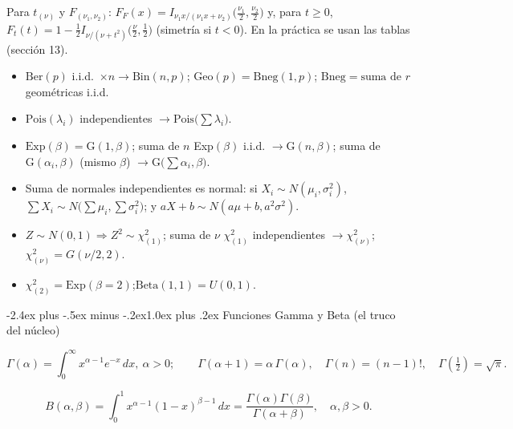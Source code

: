 \documentclass[10pt,a4paper]{article}
\makeatletter
\renewcommand\section{\@startsection{section}{1}{0pt}%
  {-2.4ex plus -.5ex minus -.2ex}{1.0ex plus .2ex}%
  {\normalfont\large\bfseries\color{seccolor}}}
\makeatother
\begin{document}
\smallskip
\noindent\footnotesize Para $t_{(\nu)}$ y $F_{(\nu_1,\nu_2)}$:
$F_F(x)=I_{\nu_1x/(\nu_1x+\nu_2)}\big(\tfrac{\nu_1}{2},\tfrac{\nu_2}{2}\big)$ y,
para $t\ge0$, $F_t(t)=1-\tfrac12 I_{\nu/(\nu+t^2)}\big(\tfrac\nu2,\tfrac12\big)$
(simetría si $t<0$). En la práctica se usan las tablas (sección 13).
\normalsize

\begin{thmbox}[frametitle={Relaciones entre modelos (casi todas por FGM)}]
\begin{itemize}
  \item $\text{Ber}(p)$ i.i.d.\ $\times n\to\text{Bin}(n,p)$;
        $\text{Geo}(p)=\text{Bneg}(1,p)$; $\text{Bneg}=\text{suma de }r$
        geométricas i.i.d.
  \item $\text{Pois}(\lambda_i)$ independientes $\to\text{Pois}\big(\sum\lambda_i\big)$.
  \item $\text{Exp}(\beta)=\text{G}(1,\beta)$; suma de $n$ Exp$(\beta)$ i.i.d.
        $\to\text{G}(n,\beta)$; suma de $\text{G}(\alpha_i,\beta)$ (mismo
        $\beta$) $\to\text{G}\big(\sum\alpha_i,\beta\big)$.
  \item Suma de normales independientes es normal: si $X_i\sim N(\mu_i,\sigma_i^2)$,
        $\sum X_i\sim N\big(\sum\mu_i,\sum\sigma_i^2\big)$; y
        $aX+b\sim N(a\mu+b,a^2\sigma^2)$.
  \item $Z\sim N(0,1)\Rightarrow Z^2\sim\chi^2_{(1)}$; suma de $\nu$
        $\chi^2_{(1)}$ independientes $\to\chi^2_{(\nu)}$;
        $\chi^2_{(\nu)}=G(\nu/2,2)$.
  \item $\chi^2_{(2)}=\text{Exp}(\beta=2)$;\quad $\text{Beta}(1,1)=U(0,1)$.
\end{itemize}
\end{thmbox}

\section{Funciones Gamma y Beta (el truco del núcleo)}

\begin{defbox}[frametitle={Gamma}]
\[
\Gamma(\alpha)=\int_0^\infty x^{\alpha-1}e^{-x}\,dx,\ \alpha>0;\qquad
\Gamma(\alpha+1)=\alpha\,\Gamma(\alpha),\quad
\Gamma(n)=(n-1)!,\quad \Gamma(\tfrac12)=\sqrt\pi .
\]
\end{defbox}

\begin{defbox}[frametitle={Beta}]
\[
B(\alpha,\beta)=\int_0^1 x^{\alpha-1}(1-x)^{\beta-1}\,dx
=\frac{\Gamma(\alpha)\Gamma(\beta)}{\Gamma(\alpha+\beta)},\quad\alpha,\beta>0 .
\]
\end{defbox}
\end{document}
